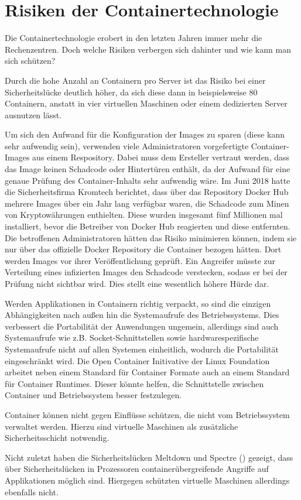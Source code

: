 \section{Risiken der Containertechnologie}
\label{sec:Risiken der Containertechnologie}
Die Containertechnologie erobert in den letzten Jahren immer mehr die Rechenzentren. Doch welche Risiken verbergen sich dahinter und wie kann man sich schützen?

Durch die hohe Anzahl an Containern pro Server ist das Risiko bei einer Sicherheitslücke deutlich höher, da sich diese dann in beispielsweise 80 Containern, anstatt in vier virtuellen Maschinen oder einem dedizierten Server ausnutzen lässt. \citep{Risiken}

Um sich den Aufwand für die Konfiguration der Images zu sparen (diese kann sehr aufwendig sein), verwenden viele Administratoren vorgefertigte Container-Images aus einem Respository.
Dabei muss dem Ersteller vertraut werden, dass das Image keinen Schadcode oder Hintertüren enthält, da der Aufwand für eine genaue Prüfung des Container-Inhalts sehr aufwendig wäre.
Im Juni 2018 hatte die Sicherheitsfirma Kromtech berichtet, dass über das Repository Docker Hub mehrere Images über ein Jahr lang verfügbar waren, die Schadcode zum Minen von Kryptowährungen enthielten.
Diese wurden insgesamt fünf Millionen mal installiert, bevor die Betreiber von Docker Hub reagierten und diese entfernten.
\citep{kromtech}
Die betroffenen Administratoren hätten das Risiko minimieren können, indem sie nur über das offizielle Docker Repository die Container bezogen hätten.
Dort werden Images vor ihrer Veröffentlichung geprüft.
\citep{DockerHubOfficial}
Ein Angreifer müsste zur Verteilung eines infizierten Images den Schadcode verstecken, sodass er bei der Prüfung nicht sichtbar wird. Dies stellt eine wesentlich höhere Hürde dar.

Werden Applikationen in Containern richtig verpackt, so sind die einzigen Abhängigkeiten nach außen hin die Systemaufrufe des Betriebssystems.
Dies verbessert die Portabilität der Anwendungen ungemein, allerdings sind auch Systemaufrufe wie z.B. Socket-Schnittstellen sowie hardwarespezifische Systemaufrufe nicht auf allen Systemen einheitlich, wodurch die Portabilität eingeschränkt wird.
Die Open Container Initivative der Linux Foundation arbeitet neben einem Standard für Container Formate auch an einem Standard für Container Runtimes.
Dieser könnte helfen, die Schnittstelle zwischen Container und Betriebssystem besser festzulegen.

Container können nicht gegen Einflüsse schützen, die nicht vom Betriebssystem verwaltet werden. Hierzu sind virtuelle Maschinen als zusätzliche Sicherheitsschicht notwendig. \citep{11517836120160501}

Nicht zuletzt haben die Sicherheitslücken Meltdown \citep{DBLP:journals/corr/abs-1801-01207} und Spectre (\citep{DBLP:journals/corr/abs-1801-01203}) gezeigt, dass über Sicherheitslücken in Prozessoren containerübergreifende Angriffe auf Applikationen möglich sind. Hiergegen schützten virtuelle Maschinen allerdings ebenfalls nicht.  
